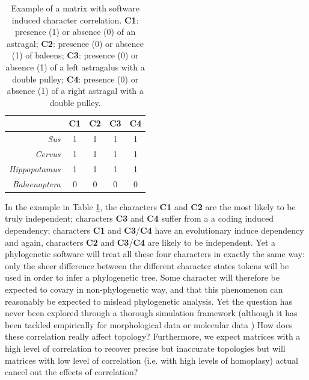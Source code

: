 \documentclass[12pt,letterpaper]{article}
\begin{document}
\begin{table}
\center
    \begin{tabular}{r|cccc}
            & C1 & C2 & C3 & C4\\
        \hline
        \textit{Sus} & 1 & 1 & 1 & 1\\
        \textit{Cervus} & 1 & 1 & 1 & 1\\
        \textit{Hippopotamus} & 1 & 1 & 1 & 1\\
        \textit{Balaenoptera} & 0 & 0 & 0 & 0\\
    \end{tabular}
    \caption{Example of a matrix with software induced character correlation. \textbf{C1}: presence (1) or absence (0) of an astragal; \textbf{C2}: presence (0) or absence (1) of baleens; \textbf{C3}: presence (0) or absence (1) of a left astragalus with a double pulley; \textbf{C4}: presence (0) or absence (1) of a right astragal with a double pulley.}
    \label{Tab:example_matrix}
\end{table}

In the example in Table \ref{Tab:example_matrix}, the characters \textbf{C1} and \textbf{C2} are the most likely to be truly independent; characters \textbf{C3} and \textbf{C4} suffer from a a coding induced dependency; characters \textbf{C1} and \textbf{C3}/\textbf{C4} have an evolutionary induce dependency and again, characters \textbf{C2} and \textbf{C3}/\textbf{C4} are likely to be independent.
Yet a phylogenetic software will treat all these four characters in exactly the same way: only the sheer difference between the different character states tokens will be used in order to infer a phylogenetic tree.
Some character will therefore be expected to covary in non-phylogenetic way, and that this phenomenon can reasonably be expected to mislead phylogenetic analysis.
Yet the question has never been explored through a thorough simulation framework (although it has been tackled empirically for morphological data \citealt{Davalos01072014} or molecular data \citealt{ZouConvergence})
How does these correlation really affect topology?
Furthermore, we expect matrices with a high level of correlation to recover precise but inaccurate topologies but will matrices with low level of correlation (i.e. with high levels of homoplasy) actual cancel out the effects of correlation?
\end{document}
